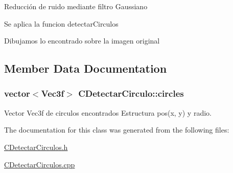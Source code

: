 Reducción de ruido mediante filtro Gaussiano

Se aplica la funcion detectar\+Circulos

Dibujamos lo encontrado sobre la imagen original 

\subsection{Member Data Documentation}
\subsubsection[{\texorpdfstring{circles}{circles}}]{\setlength{\rightskip}{0pt plus 5cm}vector$<$Vec3f$>$ C\+Detectar\+Circulo\+::circles\hspace{0.3cm}{\ttfamily [private]}}\hypertarget{classCDetectarCirculo_afb2bd271bd772e489fe948caa80bb7b7}{}\label{classCDetectarCirculo_afb2bd271bd772e489fe948caa80bb7b7}


Vector Vec3f de circulos encontrados Estructura pos(x, y) y radio. 



The documentation for this class was generated from the following files\+:\begin{DoxyCompactItemize}
\item 
\hyperlink{CDetectarCirculos_8h}{C\+Detectar\+Circulos.\+h}\item 
\hyperlink{CDetectarCirculos_8cpp}{C\+Detectar\+Circulos.\+cpp}\end{DoxyCompactItemize}
